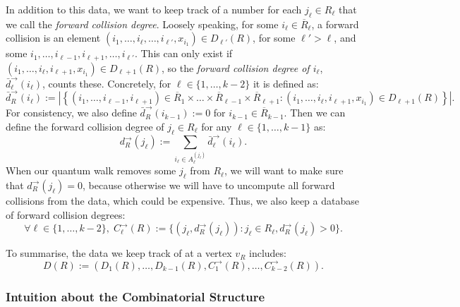 \documentclass{article}
\renewcommand{\>}{\rangle}
\newcommand{\<}{\langle}
\renewcommand{\(}{\left(}
\renewcommand{\)}{\right)}
\def\abs#1{\left| #1 \right|}
\begin{document}
In addition to this data, we want to keep track of a number for each $j_{\ell}\in R_{\ell}$ that we call the \emph{forward collision degree}. Loosely speaking, for some $i_{\ell}\in \overline{R}_{\ell}$, a forward collision is an element $(i_1,\dots,i_{\ell},\dots,i_{\ell'},x_{i_1})\in D_{\ell'}(R)$, for some $\ell'>\ell$, and some $i_1,\dots,i_{\ell-1},i_{\ell+1},\dots,i_{\ell'}$. This can only exist if $(i_1,\dots,i_{\ell},i_{\ell+1},x_{i_1})\in D_{\ell+1}(R)$, so the \emph{forward collision degree of $i_{\ell}$}, $\bar{d}_{\ell}^{\rightarrow}(i_{\ell})$, counts these. Concretely, for $\ell \in \{1,\dots,k-2\}$ it is defined as:
\begin{equation}
\bar{d}_{R}^{\rightarrow}(i_{\ell}):=\abs{\left\{(i_1,\dots,i_{\ell-1},i_{\ell+1})\in \overline{R}_1\times\dots\times\overline{R}_{\ell-1}\times\overline{R}_{\ell+1} :(i_1,\dots,i_{\ell},i_{\ell+1},x_{i_1})\in D_{\ell+1}(R)\right\}}.\label{eq:k-dist-bar-d}
\end{equation}
For consistency, we also define $\bar{d}_{R}^{\rightarrow}(i_{k-1}):=0$ for $i_{k-1}\in \overline{R}_{k-1}$. 
Then we can define the forward collision degree of $j_{\ell}\in R_{\ell}$ for any $\ell \in \{1,\dots,k-1\}$ as:
\begin{equation}
d_{R}^{\rightarrow}(j_{\ell}):=\sum_{i_{\ell}\in A_{\ell}^{(j_{\ell})}}\bar{d}_{\ell}^{\rightarrow}(i_{\ell}).
\label{eq:forward-collision-degree}
\end{equation}
When our quantum walk removes some $j_{\ell}$ from $R_{\ell}$, we will want to make sure that $d^{\rightarrow}_R(j_{\ell})=0$, because otherwise we will have to uncompute all forward collisions from the data, which could be expensive. Thus, we also keep a database of forward collision degrees:
\begin{equation}
\forall \ell\in\{1,\dots,k-2\},\; C_{\ell}^{\rightarrow}(R) := \{(j_{\ell},d_R^{\rightarrow}(j_{\ell})):j_{\ell}\in R_{\ell},d_{R}^{\rightarrow}(j_{\ell})>0\}.
\label{eq:k-dist-forward-col-db}
\end{equation}

\noindent To summarise, the data we keep track of at a vertex $v_R$ includes:
\begin{equation}
D(R):=(D_1(R),\dots,D_{k-1}(R),C^{\rightarrow}_1(R),\dots,C^{\rightarrow}_{k-2}(R)).
\label{eq:k-dist-data}
\end{equation}


\subsubsection{Intuition about the Combinatorial Structure}
\end{document}
